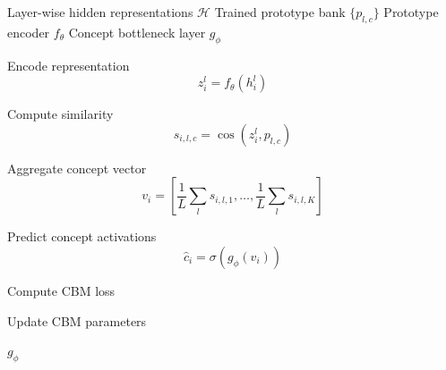 \begin{algorithm}[!t]
\caption{Layer-wise Concept Bottleneck Training with Prototype Activations}
\label{alg:layerwise_cbm_training}
\begin{algorithmic}[1]
\Require Layer-wise hidden representations $\mathcal{H}$
\Require Trained prototype bank $\{p_{l,c}\}$
\Require Prototype encoder $f_\theta$
\Require Concept bottleneck layer $g_\phi$

                \State Encode representation
                \[
                z_i^l=f_\theta(h_i^l)
                \]

                \State Compute similarity
                \[
                s_{i,l,c}
                =
                \cos(z_i^l,p_{l,c})
                \]
            \EndFor

            \State Aggregate concept vector
            \[
            v_i
            =
            \left[
            \frac{1}{L}\sum_l s_{i,l,1},
            \dots,
            \frac{1}{L}\sum_l s_{i,l,K}
            \right]
            \]

            \State Predict concept activations
            \[
            \hat{c}_i
            =
            \sigma(g_\phi(v_i))
            \]

            \State Compute CBM loss
        \EndFor

        \State Update CBM parameters
    \EndFor
\EndFor

\State \Return $g_\phi$
\end{algorithmic}
\end{algorithm}
